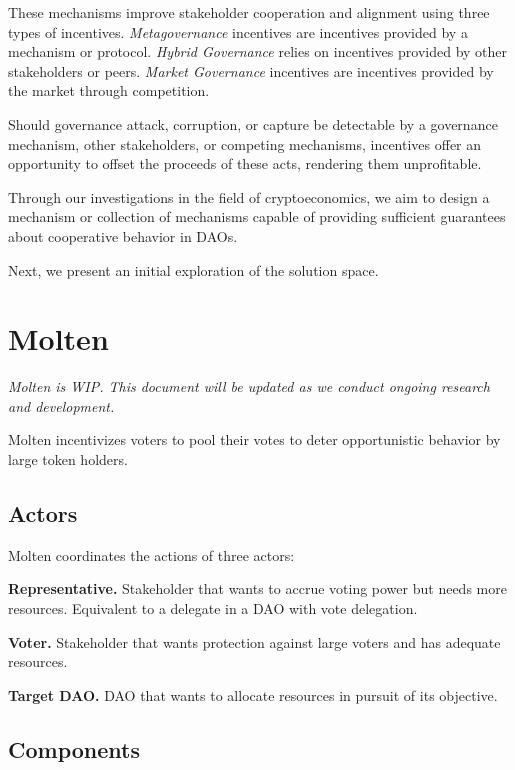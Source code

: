 \documentclass[
]{article}
\begin{document}
These mechanisms improve stakeholder cooperation and alignment using
three types of incentives. \emph{Metagovernance} incentives are
incentives provided by a mechanism or protocol. \emph{Hybrid Governance}
relies on incentives provided by other stakeholders or peers.
\emph{Market Governance} incentives are incentives provided by the
market through competition.

Should governance attack, corruption, or capture be detectable by a
governance mechanism, other stakeholders, or competing mechanisms,
incentives offer an opportunity to offset the proceeds of these acts,
rendering them unprofitable.

Through our investigations in the field of cryptoeconomics, we aim to
design a mechanism or collection of mechanisms capable of providing
sufficient guarantees about cooperative behavior in DAOs.

Next, we present an initial exploration of the solution space.
\hypertarget{molten}{%
\section{Molten}\label{molten}}

\emph{Molten is WIP. This document will be updated as we conduct ongoing
research and development.}

Molten incentivizes voters to pool their votes to deter opportunistic
behavior by large token holders.

\hypertarget{actors}{%
\subsection{Actors}\label{actors}}

Molten coordinates the actions of three actors:

\textbf{Representative.} Stakeholder that wants to accrue voting power
but needs more resources. Equivalent to a delegate in a DAO with vote
delegation.

\textbf{Voter.} Stakeholder that wants protection against large voters
and has adequate resources.

\textbf{Target DAO.} DAO that wants to allocate resources in pursuit of
its objective.

\hypertarget{components}{%
\subsection{Components}\label{components}}
\end{document}
